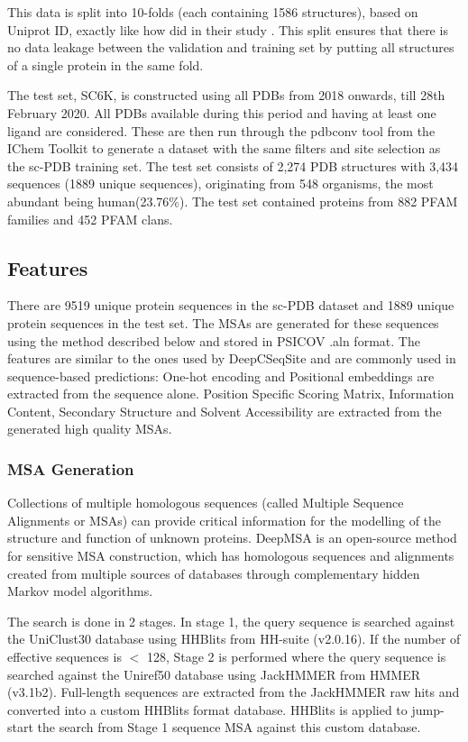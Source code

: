 \documentclass[journal=jacsat,manuscript=article]{achemso}
\begin{document}
This data is split into 10-folds (each containing 1586 structures), based on Uniprot ID, exactly like how \citeauthor{stepniewska2020improving} did in their study \cite{stepniewska2020improving}. This split ensures that there is no data leakage between the validation and training set by putting all structures of a single protein in the same fold.

The test set, SC6K, is constructed using all PDBs from 2018 onwards, till 28th February 2020. All PDBs available during this period and having at least one ligand are considered. These are then run through the pdbconv tool from the IChem Toolkit \cite{da2018ichem} to generate a dataset with the same filters and site selection as the sc-PDB\cite{desaphy2015sc} training set. The test set consists of 2,274 PDB structures with 3,434 sequences (1889 unique sequences), originating from 548 organisms, the most abundant being human(23.76\%). The test set contained proteins from 882 PFAM families and 452 PFAM clans.

\subsection{Features}
\quad There are 9519 unique protein sequences in the sc-PDB\cite{desaphy2015sc} dataset and 1889 unique protein sequences in the test set. The MSAs are generated for these sequences using the method described below and stored in PSICOV \cite{jones2012psicov} .aln format. The features are similar to the ones used by DeepCSeqSite\cite{cui2019predicting} and are commonly used in sequence-based predictions: One-hot encoding and Positional embeddings are extracted from the sequence alone. Position Specific Scoring Matrix, Information Content, Secondary Structure and Solvent Accessibility are extracted from the generated high quality MSAs.

\subsubsection{MSA Generation}
\quad Collections of multiple homologous sequences (called Multiple Sequence Alignments or MSAs) can provide critical information for the modelling of the structure and function of unknown proteins. DeepMSA \cite{zhang2020deepmsa} is an open-source method for sensitive MSA construction, which has homologous sequences and alignments created from multiple sources of databases through complementary hidden Markov model algorithms.

The search is done in 2 stages. In stage 1, the query sequence is searched against the UniClust30 \cite{mirdita2017uniclust} database using HHBlits from HH-suite\cite{remmert2012hhblits} (v2.0.16). If the number of effective sequences is $<$ 128, Stage 2 is performed where the query sequence is searched against the Uniref50 \cite{suzek2015uniref} database using JackHMMER from HMMER \cite{johnson2010hidden} (v3.1b2). Full-length sequences are extracted from the JackHMMER raw hits and converted into a custom HHBlits format database. HHBlits is applied to jump-start the search from Stage 1 sequence MSA against this custom database.
\end{document}
